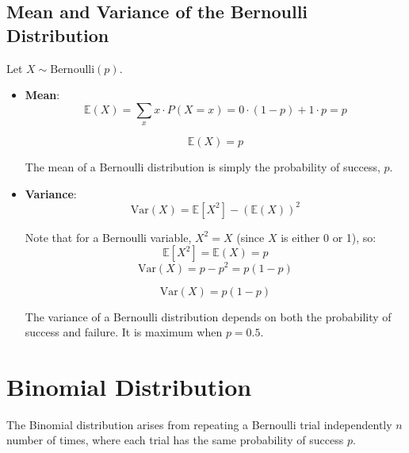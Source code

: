 \documentclass[twoside]{book}
\begin{document}
\begin{center}
\end{center}

\subsection{Mean and Variance of the Bernoulli Distribution}

Let $X \sim \text{Bernoulli}(p)$.
\begin{itemize}
    \item \textbf{Mean}:
\[
\mathbb{E}(X) = \sum_{x} x \cdot P(X = x) = 0 \cdot (1 - p) + 1 \cdot p = p
\]
\begin{textbox}
    \[
\mathbb{E}(X) = p
\]
\end{textbox}

The mean of a Bernoulli distribution is simply the probability of success, $p$.


\item \textbf{Variance}:
\[
\text{Var}(X) = \mathbb{E}[X^2] - (\mathbb{E}(X))^2
\]

Note that for a Bernoulli variable, $X^2 = X$ (since $X$ is either 0 or 1), so:
\[
\mathbb{E}[X^2] = \mathbb{E}(X) = p
\]
\[
\text{Var}(X) = p - p^2 = p(1 - p)
\]
\begin{textbox}
    \[
\text{Var}(X) = p(1 - p)
\]
\end{textbox}

The variance of a Bernoulli distribution depends on both the probability of success and failure. It is maximum when $p = 0.5$.
\end{itemize}

\section{Binomial Distribution}

The {Binomial distribution} arises from repeating a Bernoulli trial independently $n$ number of times, where each trial has the same probability of success $p$.
\end{document}
